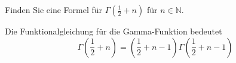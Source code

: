 Finden Sie eine Formel für $\Gamma(\frac12+n)$ für $n\in\mathbb{N}$.

\begin{loesung}
Die Funktionalgleichung für die Gamma-Funktion bedeutet
\[
\Gamma({\textstyle\frac12}+n)
=
({\textstyle\frac12}+n-1)
\Gamma({\textstyle\frac12}+n-1)
\]
\end{loesung}
